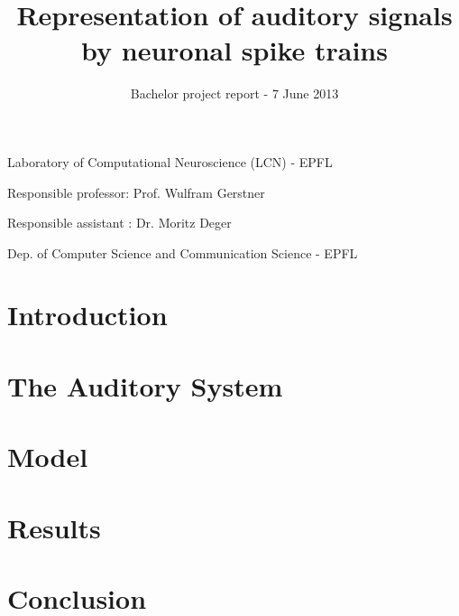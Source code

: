 \documentclass[nocopyrightspace,11pt,authoryear,preprint]{sigplanconf}
\begin{document}

\title{Representation of auditory signals by neuronal spike trains}
\subtitle{Bachelor project report - 7 June 2013} 

           {Laboratory of Computational Neuroscience (LCN) - EPFL
					
					Responsible professor: Prof. Wulfram Gerstner
					
					Responsible assistant : Dr. Moritz Deger}
					 {Dep. of Computer Science and Communication Science - EPFL}
\maketitle

\section{Introduction}


\section{The Auditory System}


\section{Model}


\section{Results}


\section{Conclusion}





\end{document}
